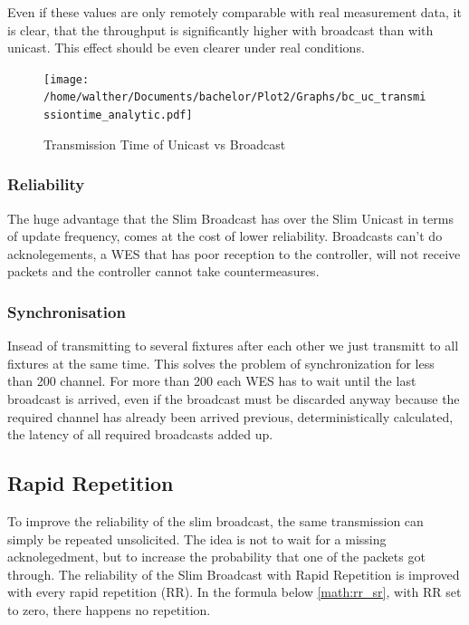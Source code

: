 Even if these values are only remotely comparable with real measurement data, it is clear,
that the throughput is significantly higher with broadcast than with unicast.
This effect should be even clearer under real conditions.

\begin{figure}[h]
	\centering
	\texttt{[image: /home/walther/Documents/bachelor/Plot2/Graphs/bc\_uc\_transmissiontime\_analytic.pdf]}
	\caption{Transmission Time of Unicast vs Broadcast}
	\label{fig:bc_uc_transmissiontime_analytic}
\end{figure}

\subsubsection*{Reliability}

The huge advantage that the Slim Broadcast has over the Slim Unicast in terms of update frequency,
comes at the cost of lower reliability.
Broadcasts can't do acknolegements,
a WES that has poor reception to the controller, will not receive packets and the controller cannot take countermeasures.

\subsubsection*{Synchronisation}
Insead of transmitting to several fixtures after each other we just transmitt to all fixtures at the same time.
This solves the problem of synchronization for less than 200 channel.
For more than 200 each WES has to wait until the last broadcast is arrived, 
even if the broadcast must be discarded anyway because the required channel has already been arrived previous,
deterministically calculated, the latency of all required broadcasts added up.

\subsection*{Rapid Repetition}


To improve the reliability of the slim broadcast, the same transmission can simply be repeated unsolicited.
The idea is not to wait for a missing acknolegedment, but to increase the probability that one of the packets got through.
The reliability of the Slim Broadcast with Rapid Repetition is improved with every rapid repetition (RR).
In the formula below \cref{math:rr_sr}, with RR set to zero, there happens no repetition.

